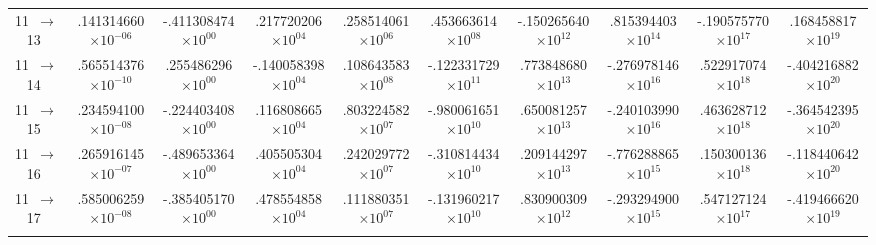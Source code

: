 \documentclass[reviewcopy]{elsarticle}
\begin{document}
\begin{landscape}
\begin{longtable}{lccccccccc}
 11~$\to$~ 13  &   .141314660$\times10^{-06}$ & -.411308474$\times10^{ 00}$ &  .217720206$\times10^{ 04}$ &  .258514061$\times10^{ 06}$ &  .453663614$\times10^{ 08}$ & -.150265640$\times10^{ 12}$ &  .815394403$\times10^{ 14}$ & -.190575770$\times10^{ 17}$ &  .168458817$\times10^{ 19}$ \\
 11~$\to$~ 14  &   .565514376$\times10^{-10}$ &  .255486296$\times10^{ 00}$ & -.140058398$\times10^{ 04}$ &  .108643583$\times10^{ 08}$ & -.122331729$\times10^{ 11}$ &  .773848680$\times10^{ 13}$ & -.276978146$\times10^{ 16}$ &  .522917074$\times10^{ 18}$ & -.404216882$\times10^{ 20}$ \\
 11~$\to$~ 15  &  .234594100$\times10^{-08}$ & -.224403408$\times10^{ 00}$ &  .116808665$\times10^{ 04}$ &  .803224582$\times10^{ 07}$ & -.980061651$\times10^{ 10}$ &  .650081257$\times10^{ 13}$ & -.240103990$\times10^{ 16}$ &  .463628712$\times10^{ 18}$ & -.364542395$\times10^{ 20}$ \\
 11~$\to$~ 16  &  .265916145$\times10^{-07}$ & -.489653364$\times10^{ 00}$ &  .405505304$\times10^{ 04}$ &  .242029772$\times10^{ 07}$ & -.310814434$\times10^{ 10}$ &  .209144297$\times10^{ 13}$ & -.776288865$\times10^{ 15}$ &  .150300136$\times10^{ 18}$ & -.118440642$\times10^{ 20}$ \\
 11~$\to$~ 17  &   .585006259$\times10^{-08}$ & -.385405170$\times10^{ 00}$ &  .478554858$\times10^{ 04}$ &  .111880351$\times10^{ 07}$ & -.131960217$\times10^{ 10}$ &  .830900309$\times10^{ 12}$ & -.293294900$\times10^{ 15}$ &  .547127124$\times10^{ 17}$ & -.419466620$\times10^{ 19}$ \\[3pt]
\hline \\
\end{longtable}
\normalsize
\renewcommand{\thefootnote}{\arabic{footnote}}
\renewcommand{\arraystretch}{1.0}
\end{landscape}

\newpage
\end{document}

